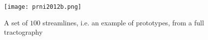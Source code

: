 \begin{figure}
  \centering
  \texttt{[image: prni2012b.png]}
  \caption{A set of $100$ streamlines, i.e. an example of prototypes,
    from a full tractography}
  \label{fig:streamlines}
\end{figure}


